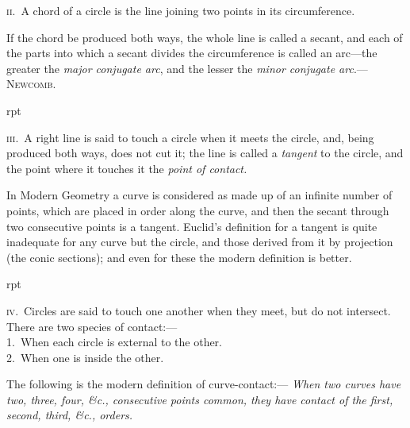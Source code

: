 \documentclass[oneside]{book}
\newcommand\imgflow[3]{
\setcounter{wrapwidth}{#1}
\begin{wrapfigure}[#2]{r}{\value{wrapwidth}pt}
\begin{center}
\vspace{-0.3in}
\end{center}
\end{wrapfigure}
}
\begin{document}
\textsc{ii}.\ A chord of a circle is the line joining two points
in its circumference.\par\medskip

\begin{footnotesize}
If the chord be produced both ways, the whole line is called a
secant, and each of the parts into which a secant divides the circumference
is called an arc---the greater the \emph{major conjugate arc},
and the lesser the \emph{minor conjugate arc}.---\textsc{Newcomb}.
\par\end{footnotesize}\medskip

\imgflow{126}{10}{f100}

\textsc{iii}.\ A right line is said to
touch a circle when it meets
the circle, and, being produced
both ways, does not cut it;
the line is called a \emph{tangent}
to the circle, and the point
where it touches it the \emph{point
of contact.}\par\medskip

\begin{footnotesize}
In Modern Geometry a curve is considered as made up of an
infinite number of points, which are placed in order along the
curve, and then the secant through two consecutive points is a
tangent. Euclid's definition for a tangent is quite inadequate for
any curve but the circle, and those derived from it by projection
(the conic sections); and even for these the modern definition is
better.
\par\end{footnotesize}\medskip

\imgflow{160}{9}{f101}

\textsc{iv}.\ Circles are said to
touch one another when
they meet, but do not
intersect. There are two
species of contact:---\\
1.~When each circle is
external to the other.\\
2.~When one is inside
the other.\par\smallskip

\begin{footnotesize}
The following is the modern definition of curve-contact:---
\emph{When two curves have two, three, four, \&c., consecutive points
common, they have contact of the first, second, third, \&c., orders.}
\par\end{footnotesize}\smallskip
\end{document}
